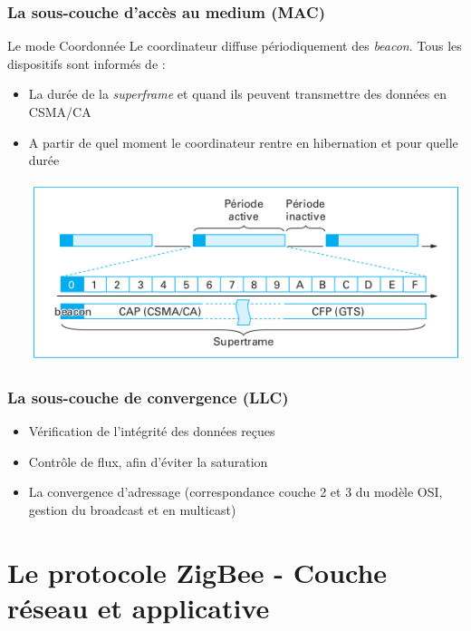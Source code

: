 \documentclass{beamer}
\begin{document}
  \begin{frame}
    \frametitle{La sous-couche d'accès au medium (MAC)}
    \begin{block}{Le mode Coordonnée}
      Le coordinateur diffuse périodiquement des \textit{beacon}. Tous les dispositifs sont informés de :
      \begin{itemize}
        \item La durée de la \textit{superframe} et quand ils peuvent transmettre des données en CSMA/CA
        \item A partir de quel moment le coordinateur rentre en hibernation et pour quelle durée
	\begin{center}
	\includegraphics[scale=0.4]{Supertrame.png}
	\end{center} 
      \end{itemize}
    \end{block}
  \end{frame}

  \begin{frame}
    \frametitle{La sous-couche de convergence (LLC)}
    \begin{itemize}
      \item Vérification de l'intégrité des données reçues
      \item Contrôle de flux, afin d'éviter la saturation
      \item La convergence d'adressage (correspondance couche 2 et 3 du modèle OSI, gestion du broadcast et en multicast)
    \end{itemize}
  \end{frame}

  \section{Le protocole ZigBee - Couche réseau et applicative}
\end{document}
